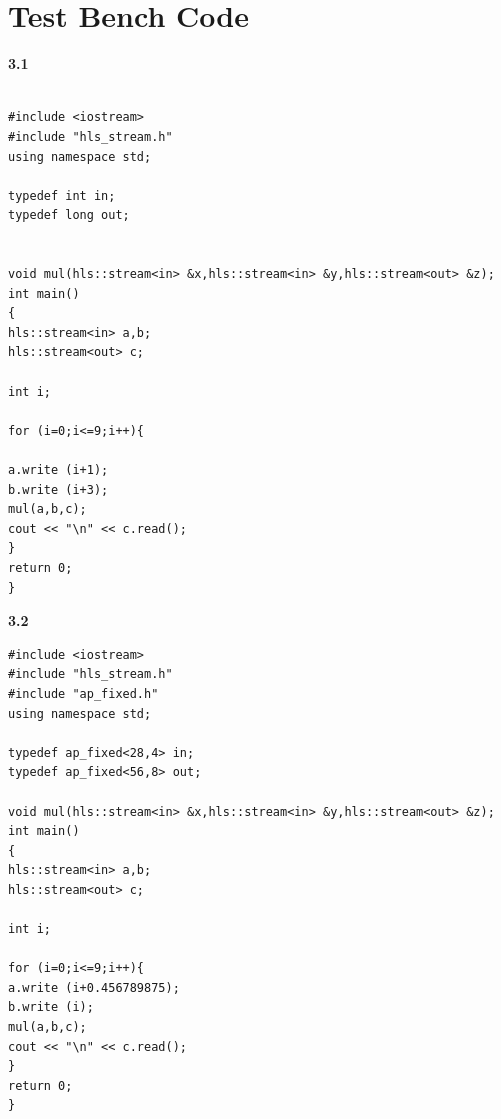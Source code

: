 \documentclass{article}
\begin{document}
\section{Test Bench Code}
\textbf{3.1}
\begin{lstlisting}

#include <iostream>
#include "hls_stream.h"
using namespace std;

typedef int in;
typedef long out;


void mul(hls::stream<in> &x,hls::stream<in> &y,hls::stream<out> &z);
int main()
{
hls::stream<in> a,b;
hls::stream<out> c;

int i;

for (i=0;i<=9;i++){

a.write (i+1);
b.write (i+3);
mul(a,b,c);
cout << "\n" << c.read();
}
return 0;
}

\end{lstlisting}
\vspace{2cm}
\textbf{3.2}
\begin{lstlisting}
#include <iostream>
#include "hls_stream.h"
#include "ap_fixed.h"
using namespace std;

typedef ap_fixed<28,4> in;
typedef ap_fixed<56,8> out;

void mul(hls::stream<in> &x,hls::stream<in> &y,hls::stream<out> &z);
int main()
{
hls::stream<in> a,b;
hls::stream<out> c;

int i;

for (i=0;i<=9;i++){
a.write (i+0.456789875);
b.write (i);
mul(a,b,c);
cout << "\n" << c.read();
}
return 0;
}



\end{lstlisting}

\vspace{5cm}
\end{document}
